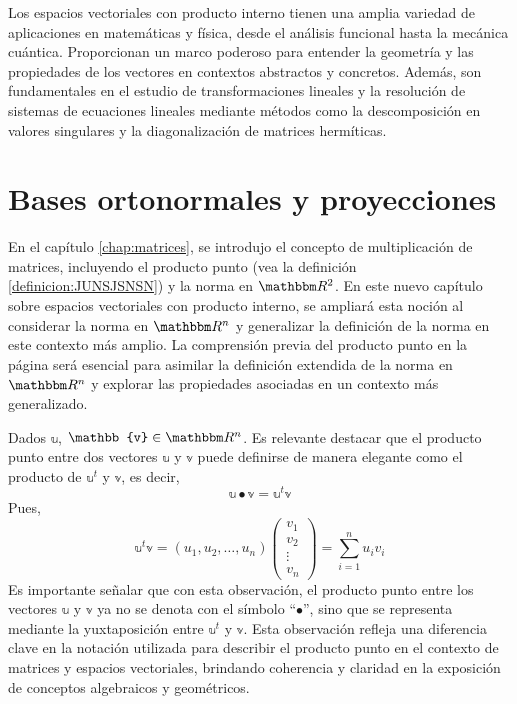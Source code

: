 Los espacios vectoriales con producto interno tienen una amplia variedad de aplicaciones en matemáticas y física, desde el análisis funcional hasta la mecánica cuántica. Proporcionan un marco poderoso para entender la geometría y las propiedades de los vectores en contextos abstractos y concretos. Además, son fundamentales en el estudio de transformaciones lineales y la resolución de sistemas de ecuaciones lineales mediante métodos como la descomposición en valores singulares y la diagonalización de matrices hermíticas.

\section{Bases ortonormales y proyecciones}\label{sec:orto}

En el capítulo \ref{chap:matrices}, se introdujo el concepto de multiplicación de matrices, incluyendo el producto punto (vea la definición \ref{definicion:JUNSJSNSN}) y la norma en $\RR[2]$. En este nuevo capítulo sobre espacios vectoriales con producto interno, se ampliará esta noción al considerar la norma en \( \RR[n] \) y generalizar la definición de la norma en este contexto más amplio. La comprensión previa del producto punto en la página \pageref{definicion:JUNSJSNSN} será esencial para asimilar la definición extendida de la norma en \( \RR[n] \) y explorar las propiedades asociadas en un contexto más generalizado.

\begin{observation}\label{Obs:innerproduct}
    Dados $\mathbb{u}$, $\mathbb{v} \in \RR[n]$. Es relevante destacar que el producto punto entre dos vectores $\mathbb{u}$ y $\mathbb{v}$ puede definirse de manera elegante como el producto de $\mathbb{u}^t$ y $\mathbb{v}$, es decir,
    $$\mathbb{u} \bullet \mathbb{v} = \mathbb{u}^t \mathbb{v}$$
    Pues,
    $$\mathbb{u}^t \mathbb{v} = (u_1, u_2, \dots, u_n) \begin{pmatrix} v_1 \\ v_2 \\ \vdots \\ v_n \end{pmatrix} = \sum_{i=1}^n u_i v_i$$
    Es importante señalar que con esta observación, el producto punto entre los vectores \( \mathbb{u} \) y \( \mathbb{v} \) ya no se denota con el símbolo “$\bullet$”, sino que se representa mediante la yuxtaposición entre \( \mathbb{u}^t \) y \( \mathbb{v} \). Esta observación refleja una diferencia clave en la notación utilizada para describir el producto punto en el contexto de matrices y espacios vectoriales, brindando coherencia y claridad en la exposición de conceptos algebraicos y geométricos.
\end{observation}

